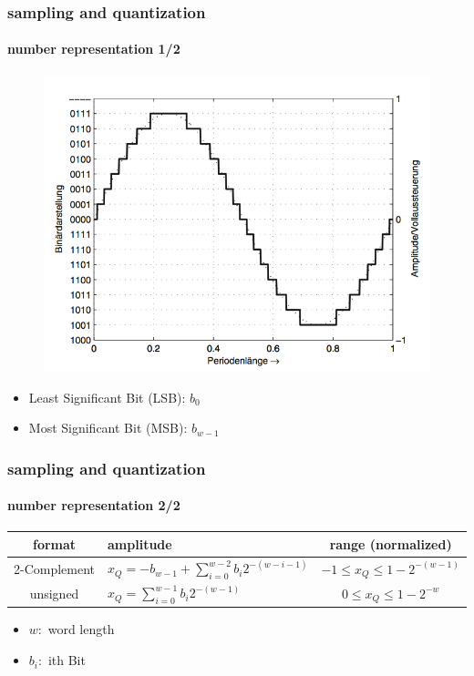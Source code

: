 	\begin{frame}\frametitle{sampling and quantization}\framesubtitle{number representation 1/2}
	    \begin{figure}
			\centering
				\includegraphics[scale=0.6]{Graph/2complement}
		\end{figure}
		\begin{itemize}
			\item	Least Significant Bit (LSB): $b_0$
			\item	Most Significant Bit (MSB): $b_{w-1}$
		\end{itemize}
	\end{frame}	

	\begin{frame}\frametitle{sampling and quantization}\framesubtitle{number representation 2/2}
		\begin{table}
			\centering
			\begin{footnotesize}
				\begin{tabular}{clc}
				\hline
				\textbf{format} & \textbf{amplitude} & \textbf{range (normalized)}\\
				\hline
				2-Complement & $x_Q = -b_{w-1} + \sum\limits_{i=0}^{w-2}b_{i}2^{-(w-i-1)}$ & $-1\leq x_Q \leq 1-2^{-(w-1)}$\\
				unsigned & $x_Q = \sum\limits_{i=0}^{w-1}b_i2^{-(w-1)}$ & $0\leq x_Q \leq 1-2^{-w}$\\
				\hline
				\end{tabular}
			\end{footnotesize}
		\end{table}
		\begin{itemize}
			\item	$w:$ word length
			\item	$b_i:$ ith Bit
		\end{itemize}
	\end{frame}
	
